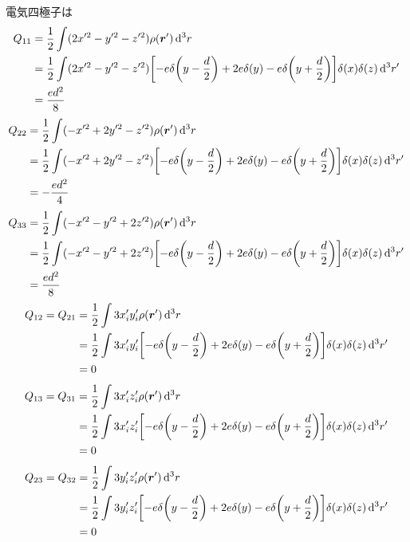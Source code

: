 \documentclass[../../sp_2022.tex]{subfiles}
\begin{document}
電気四極子は
\begin{equation}\begin{aligned}[b]
    Q_{11}
    &= \frac{1}{2} \int(2x'^2-y'^2-z'^2)\rho(\vb*{r}')\dd[3]{r}\\
    &= \frac{1}{2} \int(2x'^2-y'^2-z'^2) \qty[-e\delta\qty(y-\frac{d}{2})+2e\delta\qty(y)-e\delta\qty(y+\frac{d}{2})]\delta(x)\delta(z)\dd[3]{r'}\\
    &= \frac{ed^2}{8}
\end{aligned}\end{equation}
\begin{equation}\begin{aligned}[b]
    Q_{22}
    &= \frac{1}{2} \int(-x'^2+2y'^2-z'^2)\rho(\vb*{r}')\dd[3]{r}\\
    &= \frac{1}{2} \int(-x'^2+2y'^2-z'^2) \qty[-e\delta\qty(y-\frac{d}{2})+2e\delta\qty(y)-e\delta\qty(y+\frac{d}{2})]\delta(x)\delta(z)\dd[3]{r'}\\
    &= -\frac{ed^2}{4}
\end{aligned}\end{equation}
\begin{equation}\begin{aligned}[b]
    Q_{33}
    &= \frac{1}{2} \int(-x'^2-y'^2+2z'^2)\rho(\vb*{r}')\dd[3]{r}\\
    &= \frac{1}{2} \int(-x'^2-y'^2+2z'^2) \qty[-e\delta\qty(y-\frac{d}{2})+2e\delta\qty(y)-e\delta\qty(y+\frac{d}{2})]\delta(x)\delta(z)\dd[3]{r'}\\
    &= \frac{ed^2}{8}
\end{aligned}\end{equation}
\begin{equation}\begin{aligned}[b]
    Q_{12} = Q_{21}
    &= \frac{1}{2} \int 3x_i'y_i'\rho(\vb*{r}')\dd[3]{r}\\
    &= \frac{1}{2} \int 3x_i'y_i' \qty[-e\delta\qty(y-\frac{d}{2})+2e\delta\qty(y)-e\delta\qty(y+\frac{d}{2})]\delta(x)\delta(z)\dd[3]{r'}\\
    &= 0
\end{aligned}\end{equation}
\begin{equation}\begin{aligned}[b]
    Q_{13} = Q_{31}
    &= \frac{1}{2} \int 3x_i'z_i'\rho(\vb*{r}')\dd[3]{r}\\
    &= \frac{1}{2} \int 3x_i'z_i' \qty[-e\delta\qty(y-\frac{d}{2})+2e\delta\qty(y)-e\delta\qty(y+\frac{d}{2})]\delta(x)\delta(z)\dd[3]{r'}\\
    &= 0
\end{aligned}\end{equation}
\begin{equation}\begin{aligned}[b]
    Q_{23} = Q_{32}
    &= \frac{1}{2} \int 3y_i'z_i'\rho(\vb*{r}')\dd[3]{r}\\
    &= \frac{1}{2} \int 3y_i'z_i' \qty[-e\delta\qty(y-\frac{d}{2})+2e\delta\qty(y)-e\delta\qty(y+\frac{d}{2})]\delta(x)\delta(z)\dd[3]{r'}\\
    &= 0
\end{aligned}\end{equation}
\end{document}
